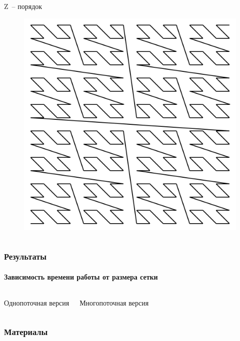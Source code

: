 \documentclass[presentation,18pt]{beamer}
\begin{document}
\begin{frame}[t]
\begin{columns}
\begin{block}{Z~-- порядок}
			\begin{figure}
				\includegraphics[width=\textwidth]{img/ZOrderCurve.png}
			\end{figure}
		\end{block}

	\end{columns}
\end{frame}


\begin{frame}
	\label{conclusion}
	\frametitle{Результаты}
	\framesubtitle{Зависимость времени работы от размера сетки}

	\begin{columns}

		\begin{block}{Однопоточная версия}
			\vspace{150pt}
		\end{block}

		\begin{block}{Многопоточная версия}
			\vspace{150pt}
		\end{block}

	\end{columns}
\end{frame}

\begin{frame}
	\label{materials}
	\frametitle{Материалы}
\end{frame}

\end{document}
